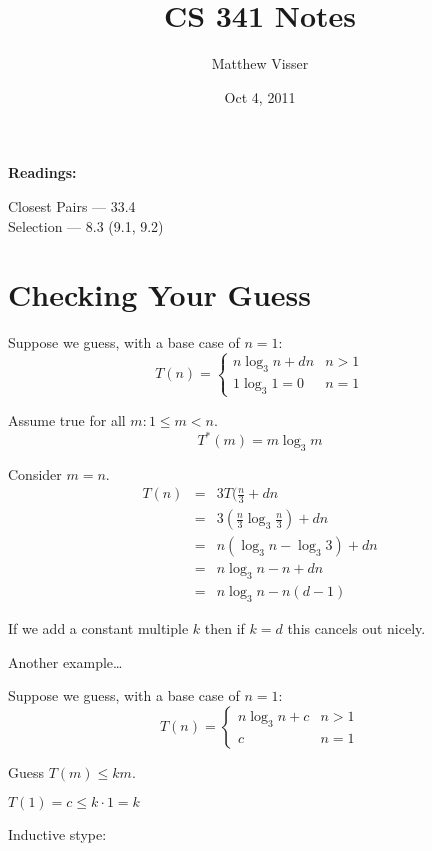 \documentclass[12pt]{article}
\begin{document}
\title{CS 341 Notes}
\author{Matthew Visser}
\date{Oct  4, 2011}
\maketitle

\textbf{Readings:}

Closest Pairs --- 33.4\\
Selection --- 8.3 (9.1, 9.2)

\section{Checking Your Guess}

Suppose we guess, with a base case of $n=1$:
\begin{equation}
	T(n) = \begin{cases}
		n \log_3 n + dn & n > 1\\
		1 \log_3 1 = 0 & n=1
	\end{cases}
\end{equation}

Assume true for all $m: 1\leq m < n$.
\begin{equation}
	T^*(m) = m \log_3 m
\end{equation}

Consider $m=n$.
\begin{eqnarray}
	T(n) &=& 3T(\frac{n}{3} + dn\\
	&=& 3 \left( \frac{n}{3} \log_3 \frac{n}{3} \right) + dn \\
	&=&  n \left( \log_3 n - \log_3 3  \right) + dn\\
	&=&  n \log_3n - n + dn\\
	&=& n \log_3 n - n(d-1)
\end{eqnarray}

If we add a constant multiple $k$ then if $k=d$ this cancels out nicely.

Another example\dots

Suppose we guess, with a base case of $n=1$:
\begin{equation}
	T(n) = \begin{cases}
		n \log_3 n  + c& n > 1\\
		c & n=1
	\end{cases}
\end{equation}

Guess $T(m) \leq km$.

$T(1) = c \leq k\cdot 1 = k$

Inductive stype:
\end{document}
